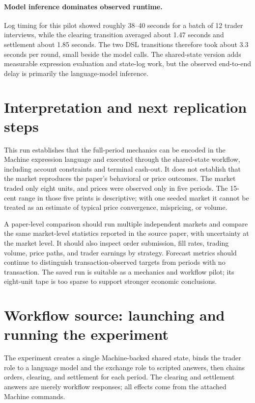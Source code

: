 \documentclass[11pt]{article}
\begin{document}
\paragraph{Model inference dominates observed runtime.} Log timing for this
pilot showed roughly 38--40 seconds for a batch of 12 trader interviews, while
the clearing transition averaged about 1.47 seconds and settlement about 1.85
seconds. The two DSL transitions therefore took about 3.3 seconds per round,
small beside the model calls. The shared-state version adds measurable
expression evaluation and state-log work, but the observed end-to-end delay is
primarily the language-model inference.

\section{Interpretation and next replication steps}
This run establishes that the full-period mechanics can be encoded in the
Machine expression language and executed through the shared-state workflow,
including account constraints and terminal cash-out. It does not establish
that the market reproduces the paper's behavioral or price outcomes. The market
traded only eight units, and prices were observed only in five periods. The
15-cent range in those five prints is descriptive; with one seeded market it
cannot be treated as an estimate of typical price convergence, mispricing, or
volume.

A paper-level comparison should run multiple independent markets and compare
the same market-level statistics reported in the source paper, with uncertainty
at the market level. It should also inspect order submission, fill rates,
trading volume, price paths, and trader earnings by strategy. Forecast metrics
should continue to distinguish transaction-observed targets from periods with
no transaction. The saved run is suitable as a mechanics and workflow pilot;
its eight-unit tape is too sparse to support stronger economic conclusions.

\appendix
\section{Workflow source: launching and running the experiment}
The experiment creates a single Machine-backed shared state, binds the trader
role to a language model and the exchange role to scripted answers, then chains
orders, clearing, and settlement for each period. The clearing and settlement
answers are merely workflow responses; all effects come from the attached
Machine commands.
\end{document}

